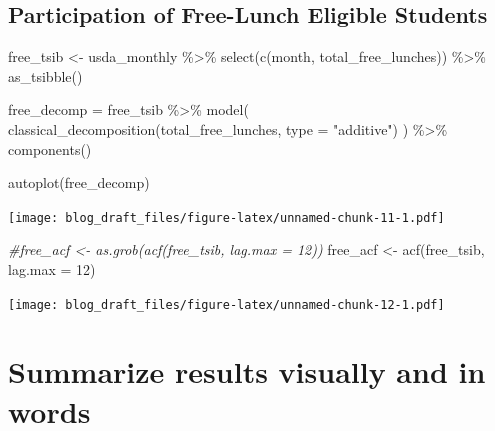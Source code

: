 \documentclass[
]{article}
\newenvironment{Shaded}{\begin{snugshade}}{\end{snugshade}}
\newcommand{\AttributeTok}[1]{\textcolor[rgb]{0.77,0.63,0.00}{#1}}
\newcommand{\CommentTok}[1]{\textcolor[rgb]{0.56,0.35,0.01}{\textit{#1}}}
\newcommand{\DecValTok}[1]{\textcolor[rgb]{0.00,0.00,0.81}{#1}}
\newcommand{\FunctionTok}[1]{\textcolor[rgb]{0.00,0.00,0.00}{#1}}
\newcommand{\NormalTok}[1]{#1}
\newcommand{\OtherTok}[1]{\textcolor[rgb]{0.56,0.35,0.01}{#1}}
\newcommand{\SpecialCharTok}[1]{\textcolor[rgb]{0.00,0.00,0.00}{#1}}
\newcommand{\StringTok}[1]{\textcolor[rgb]{0.31,0.60,0.02}{#1}}
\begin{document}
\hypertarget{participation-of-free-lunch-eligible-students}{%
\subsection{Participation of Free-Lunch Eligible
Students}\label{participation-of-free-lunch-eligible-students}}

\begin{Shaded}
\begin{Highlighting}[]
\NormalTok{free\_tsib }\OtherTok{\textless{}{-}}\NormalTok{ usda\_monthly }\SpecialCharTok{\%\textgreater{}\%} 
  \FunctionTok{select}\NormalTok{(}\FunctionTok{c}\NormalTok{(month, total\_free\_lunches)) }\SpecialCharTok{\%\textgreater{}\%} 
  \FunctionTok{as\_tsibble}\NormalTok{()}
\end{Highlighting}
\end{Shaded}

\begin{Shaded}
\begin{Highlighting}[]
\NormalTok{free\_decomp }\OtherTok{=}\NormalTok{ free\_tsib }\SpecialCharTok{\%\textgreater{}\%} 
  \FunctionTok{model}\NormalTok{(}
    \FunctionTok{classical\_decomposition}\NormalTok{(total\_free\_lunches, }\AttributeTok{type =} \StringTok{"additive"}\NormalTok{)}
\NormalTok{  ) }\SpecialCharTok{\%\textgreater{}\%} 
  \FunctionTok{components}\NormalTok{()}

\FunctionTok{autoplot}\NormalTok{(free\_decomp)}
\end{Highlighting}
\end{Shaded}

\texttt{[image: blog\_draft\_files/figure-latex/unnamed-chunk-11-1.pdf]}

\begin{Shaded}
\begin{Highlighting}[]
\CommentTok{\#free\_acf \textless{}{-} as.grob(acf(free\_tsib, lag.max = 12))}
\NormalTok{free\_acf }\OtherTok{\textless{}{-}} \FunctionTok{acf}\NormalTok{(free\_tsib, }\AttributeTok{lag.max =} \DecValTok{12}\NormalTok{)}
\end{Highlighting}
\end{Shaded}

\texttt{[image: blog\_draft\_files/figure-latex/unnamed-chunk-12-1.pdf]}

\hypertarget{summarize-results-visually-and-in-words}{%
\section{Summarize results visually and in
words}\label{summarize-results-visually-and-in-words}}
\end{document}
